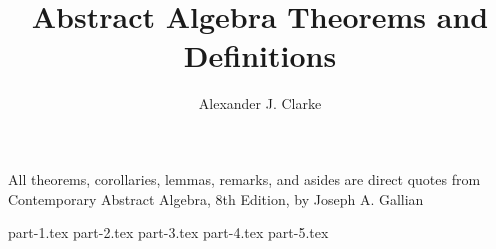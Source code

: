 \documentclass[12pt,letterpaper]{report}
\author{Alexander J. Clarke}
\title{Abstract Algebra Theorems and Definitions}
\begin{document}
\maketitle
\clearpage
\begin{center}
	\thispagestyle{empty}
	\vspace*{\fill}
	All theorems, corollaries, lemmas, remarks, and asides are direct quotes from Contemporary Abstract Algebra, 8th Edition, by Joseph A. Gallian
	\vspace*{\fill}
\end{center}
\tableofcontents

{part-1.tex}
{part-2.tex}
{part-3.tex}
{part-4.tex}
{part-5.tex}
\end{document}
